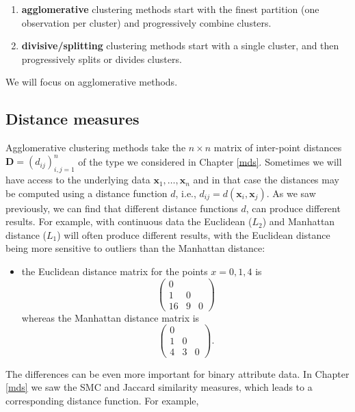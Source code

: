 \documentclass[
]{book}
\providecommand{\tightlist}{%
  \setlength{\itemsep}{0pt}\setlength{\parskip}{0pt}}
\theoremstyle{definition}
\theoremstyle{definition}
\theoremstyle{definition}
\theoremstyle{definition}
\theoremstyle{remark}
\begin{document}
\begin{enumerate}
\def\labelenumi{\arabic{enumi}.}
\item
  \textbf{agglomerative} clustering methods start with the finest partition (one observation per cluster) and progressively combine clusters.
\item
  \textbf{divisive/splitting} clustering methods start with a single cluster, and then progressively splits or divides clusters.
\end{enumerate}

We will focus on agglomerative methods.

\subsection{Distance measures}\label{distance-measures}

Agglomerative clustering methods take the \(n \times n\) matrix of inter-point distances \(\mathbf D=(d_{ij})_{i,j=1}^n\) of the type we considered in Chapter \ref{mds}. Sometimes we will have access to the underlying data \(\mathbf x_1, \ldots, \mathbf x_n\) and in that case the distances may be computed using a distance function \(d\), i.e., \(d_{ij}=d(\mathbf x_i, \mathbf x_j)\).
As we saw previously, we can find that different distance functions \(d\), can produce different results. For example, with continuous data the Euclidean (\(L_2\)) and Manhattan distance (\(L_1\)) will often produce different results, with the Euclidean distance being more sensitive to outliers than the Manhattan distance:

\begin{itemize}
\tightlist
\item
  the Euclidean distance matrix for the points \(x=0, 1,4\) is
  \[\begin{pmatrix}0&&\\1&0\\
  16&9&0\end{pmatrix}\]
  whereas the Manhattan distance matrix is
  \[\begin{pmatrix}0&&\\1&0\\
  4&3&0\end{pmatrix}.\]
\end{itemize}

The differences can be even more important for binary attribute data. In Chapter \ref{mds} we saw the SMC and Jaccard similarity measures, which leads to a corresponding distance function. For example,
\end{document}
